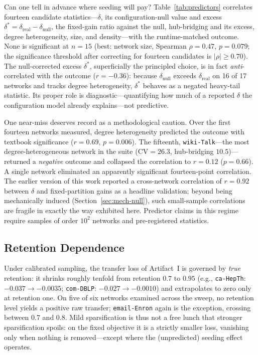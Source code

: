 Can one tell in advance where seeding will pay?
Table~\ref{tab:predictors} correlates fourteen candidate statistics---$\delta$, its configuration-null value and excess $\delta^{*} = \delta_{\mathrm{real}} - \delta_{\mathrm{null}}$, the fixed-gain ratio against the null, hub-bridging and its excess, degree heterogeneity, size, and density---with the runtime-matched outcome.
None is significant at $n = 15$ (best: network size, Spearman $\rho = 0.47$, $p = 0.079$; the significance threshold after correcting for fourteen candidates is $|\rho| \ge 0.70$).
The null-corrected excess $\delta^{*}$, superficially the principled choice, is in fact \emph{anti}-correlated with the outcome ($r = -0.36$): because $\delta_{\mathrm{null}}$ exceeds $\delta_{\mathrm{real}}$ on 16 of 17 networks and tracks degree heterogeneity, $\delta^{*}$ behaves as a negated heavy-tail statistic.
Its proper role is diagnostic---quantifying how much of a reported $\delta$ the configuration model already explains---not predictive.

One near-miss deserves record as a methodological caution.
Over the first fourteen networks measured, degree heterogeneity predicted the outcome with textbook significance ($r = 0.69$, $p = 0.006$).
The fifteenth, \texttt{wiki-Talk}---the most degree-heterogeneous network in the suite ($\mathrm{CV} = 26.3$, hub-bridging $10.5$)---returned a \emph{negative} outcome and collapsed the correlation to $r = 0.12$ ($p = 0.66$).
A single network eliminated an apparently significant fourteen-point correlation.
The earlier version of this work reported a cross-network correlation of $r = 0.92$ between $\delta$ and fixed-partition gains as a headline validation; beyond being mechanically induced (Section~\ref{sec:mech-null}), such small-sample correlations are fragile in exactly the way exhibited here.
Predictor claims in this regime require samples of order $10^2$ networks and pre-registered statistics.

\subsection{Retention Dependence}
\label{sec:boundary-retention}

Under calibrated sampling, the transfer loss of Artifact~I is governed by \emph{true} retention: it shrinks roughly tenfold from retention $0.7$ to $0.95$ (e.g., \texttt{ca-HepTh}: $-0.037 \to -0.0035$; \texttt{com-DBLP}: $-0.027 \to -0.0010$) and extrapolates to zero only at retention one.
On five of six networks examined across the sweep, no retention level yields a positive raw transfer; \texttt{email-Enron} again is the exception, crossing between $0.7$ and $0.8$.
Mild sparsification is thus not a free lunch that stronger sparsification spoils: on the fixed objective it is a strictly smaller loss, vanishing only when nothing is removed---except where the (unpredicted) seeding effect operates.
